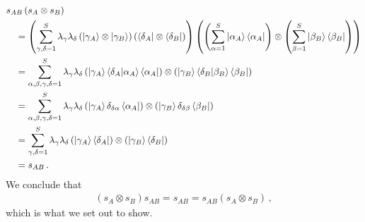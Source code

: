 \documentclass[12pt]{article}
\numberwithin{equation}{section}
\begin{document}
\begin{align}
    &s_{AB} \left( s_A \otimes s_B \right)  \nonumber \\
    &\quad = \left( \sum_{\gamma, \delta = 1}^{S} \lambda_\gamma \lambda_\delta \left( \ket{ \gamma_A } \otimes \ket{\gamma_B } \right) \left( \bra{\delta_A} \otimes \bra{\delta_B} \right)  \right)  \left( \left( \sum_{\alpha = 1}^{S} \ket{\alpha_A} \bra{\alpha_A} \right) \otimes \left( \sum_{\beta = 1}^{S} \ket{\beta_B} \bra{\beta_B} \right) \right) \nonumber \\
    &\quad = \sum_{\alpha, \beta, \gamma, \delta = 1}^{S} \lambda_\gamma \lambda_\delta \left( \ket{\gamma_A} \braket{\delta_A}{\alpha_A} \bra{\alpha_A} \right) \otimes \left( \ket{\gamma_B} \braket{\delta_B}{\beta_B} \bra{\beta_B} \right)\nonumber \\
    &\quad = \sum_{\alpha, \beta, \gamma, \delta = 1}^{S} \lambda_\gamma \lambda_\delta \left( \ket{\gamma_A} \delta_{\delta \alpha} \bra{\alpha_A} \right) \otimes \left( \ket{\gamma_B} \delta_{\delta \beta} \bra{\beta_B} \right)\nonumber \\
    &\quad = \sum_{\gamma, \delta = 1}^{S} \lambda_\gamma \lambda_\delta \left( \ket{\gamma_A} \bra{\delta_A} \right) \otimes \left( \ket{\gamma_B} \bra{\delta_B} \right)\nonumber \\
    &\quad = s_{AB} \, .
\end{align}
%
We conclude that
%
\begin{align}
   \left( s_A \otimes s_B \right) s_{AB} = s_{AB} =  s_{AB} \left( s_A \otimes s_B \right) \, ,
\end{align}
%
which is what we set out to show.



\end{document}
